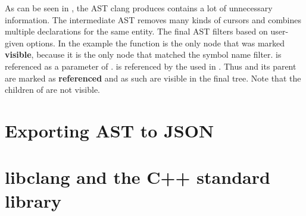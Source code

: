 As can be seen in , the AST clang produces contains a lot of unnecessary information. The intermediate AST removes many kinds of cursors and combines multiple declarations for the same entity. The final AST filters based on user-given options. In the example the function  is the only node that was marked \textbf{visible}, because it is the only node that matched the symbol name filter.  is referenced as a parameter of .  is referenced by the  used in . Thus  and its parent  are marked as \textbf{referenced} and as such are visible in the final tree. Note that the children of  are not visible.

\section{Exporting AST to JSON}

\section{libclang and the C++ standard library}
